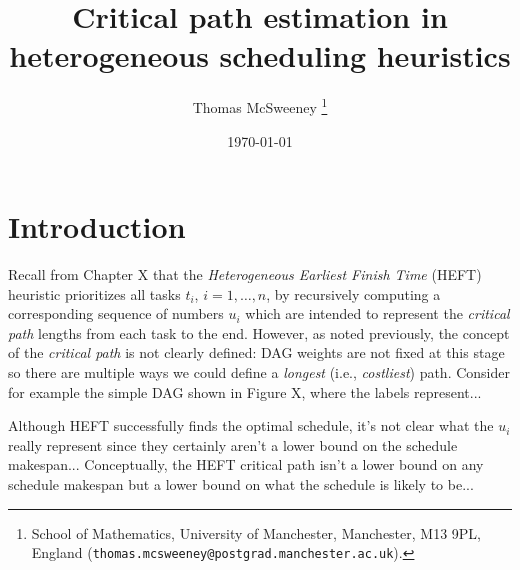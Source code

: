 \documentclass[12pt]{article}
\title{Critical path estimation in heterogeneous scheduling heuristics} %
\author{Thomas McSweeney%
	\thanks{%
		School of Mathematics,
		University of Manchester,
		Manchester, M13 9PL, England
		(\texttt{thomas.mcsweeney@postgrad.manchester.ac.uk}).
	}
}
\date{\today}
\begin{document}
	\maketitle 	


\section{Introduction}
\label{sect.intro}


Recall from Chapter X that the {\em Heterogeneous Earliest Finish Time} (HEFT) heuristic prioritizes all tasks $t_i$, $i = 1, \dots, n$, by recursively computing a corresponding sequence of numbers $u_i$ which are intended to represent the {\em critical path} lengths from each task to the end. However, as noted previously, the concept of the {\em critical path} is not clearly defined: DAG weights are not fixed at this stage so there are multiple ways we could define a {\em longest} (i.e., {\em costliest}) path. Consider for example the simple DAG shown in Figure X, where the labels represent...

Although HEFT successfully finds the optimal schedule, it's not clear what the $u_i$ really represent since they certainly aren't a lower bound on the schedule makespan... Conceptually, the HEFT critical path isn't a lower bound on any schedule makespan but a lower bound on what the schedule is likely to be...
\end{document}
